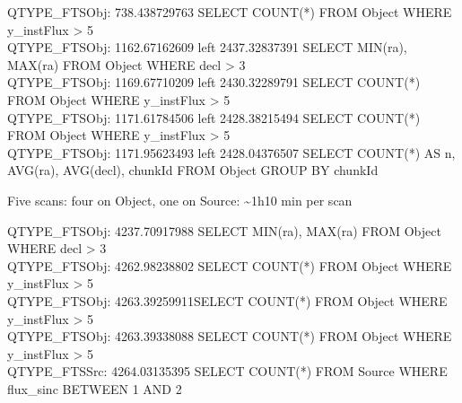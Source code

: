 QTYPE\_FTSObj: 738.438729763 SELECT COUNT(*) FROM Object WHERE
y\_instFlux \textgreater{} 5\\
QTYPE\_FTSObj: 1162.67162609 left 2437.32837391 SELECT MIN(ra), MAX(ra)
FROM Object WHERE decl \textgreater{} 3\\
QTYPE\_FTSObj: 1169.67710209 left 2430.32289791 SELECT COUNT(*) FROM
Object WHERE y\_instFlux \textgreater{} 5\\
QTYPE\_FTSObj: 1171.61784506 left 2428.38215494 SELECT COUNT(*) FROM
Object WHERE y\_instFlux \textgreater{} 5\\
QTYPE\_FTSObj: 1171.95623493 left 2428.04376507 SELECT COUNT(*) AS n,
AVG(ra), AVG(decl), chunkId FROM Object GROUP BY chunkId

Five scans: four on Object, one on Source: \textasciitilde{}1h10 min per
scan

QTYPE\_FTSObj: 4237.70917988 SELECT MIN(ra), MAX(ra) FROM Object WHERE
decl \textgreater{} 3\\
QTYPE\_FTSObj: 4262.98238802 SELECT COUNT(*) FROM Object WHERE
y\_instFlux \textgreater{} 5\\
QTYPE\_FTSObj: 4263.39259911SELECT COUNT(*) FROM Object WHERE
y\_instFlux \textgreater{} 5\\
QTYPE\_FTSObj: 4263.39338088 SELECT COUNT(*) FROM Object WHERE
y\_instFlux \textgreater{} 5\\
QTYPE\_FTSSrc: 4264.03135395 SELECT COUNT(*) FROM Source WHERE
flux\_sinc BETWEEN 1 AND 2
